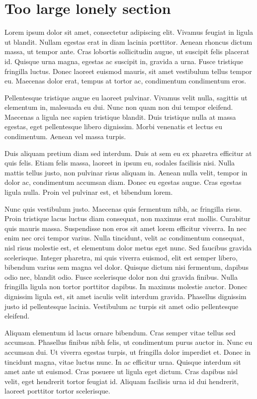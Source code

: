 \documentclass[11pt]{article}
\begin{document}
    \section{Too large lonely section} %
    Lorem ipsum dolor sit amet, consectetur adipiscing elit. Vivamus feugiat in ligula ut blandit. Nullam egestas erat in diam lacinia porttitor. Aenean rhoncus dictum massa, ut tempor ante. Cras lobortis sollicitudin augue, ut suscipit felis placerat id. Quisque urna magna, egestas ac suscipit in, gravida a urna. Fusce tristique fringilla luctus. Donec laoreet euismod mauris, sit amet vestibulum tellus tempor eu. Maecenas dolor erat, tempus at tortor ac, condimentum condimentum eros.

    Pellentesque tristique augue eu laoreet pulvinar. Vivamus velit nulla, sagittis ut elementum in, malesuada eu dui. Nunc non quam non dui tempor eleifend. Maecenas a ligula nec sapien tristique blandit. Duis tristique nulla at massa egestas, eget pellentesque libero dignissim. Morbi venenatis et lectus eu condimentum. Aenean vel massa turpis.

    Duis aliquam pretium diam sed interdum. Duis at sem eu ex pharetra efficitur at quis felis. Etiam felis massa, laoreet in ipsum eu, sodales facilisis nisi. Nulla mattis tellus justo, non pulvinar risus aliquam in. Aenean nulla velit, tempor in dolor ac, condimentum accumsan diam. Donec eu egestas augue. Cras egestas ligula nulla. Proin vel pulvinar est, et bibendum lorem.

    Nunc quis vestibulum justo. Maecenas quis fermentum nibh, ac fringilla risus. Proin tristique lacus luctus diam consequat, non maximus erat mollis. Curabitur quis mauris massa. Suspendisse non eros sit amet lorem efficitur viverra. In nec enim nec orci tempor varius. Nulla tincidunt, velit ac condimentum consequat, nisl risus molestie est, et elementum dolor metus eget nunc. Sed faucibus gravida scelerisque. Integer pharetra, mi quis viverra euismod, elit est semper libero, bibendum varius sem magna vel dolor. Quisque dictum nisi fermentum, dapibus odio nec, blandit odio. Fusce scelerisque dolor non dui gravida finibus. Nulla fringilla ligula non tortor porttitor dapibus. In maximus molestie auctor. Donec dignissim ligula est, sit amet iaculis velit interdum gravida. Phasellus dignissim justo id pellentesque lacinia. Vestibulum ac turpis sit amet odio pellentesque eleifend.

    Aliquam elementum id lacus ornare bibendum. Cras semper vitae tellus sed accumsan. Phasellus finibus nibh felis, ut condimentum purus auctor in. Nunc eu accumsan dui. Ut viverra egestas turpis, ut fringilla dolor imperdiet et. Donec in tincidunt magna, vitae luctus nunc. In ac efficitur urna. Quisque interdum sit amet ante ut euismod. Cras posuere ut ligula eget dictum. Cras dapibus nisl velit, eget hendrerit tortor feugiat id. Aliquam facilisis urna id dui hendrerit, laoreet porttitor tortor scelerisque.
\end{document}
